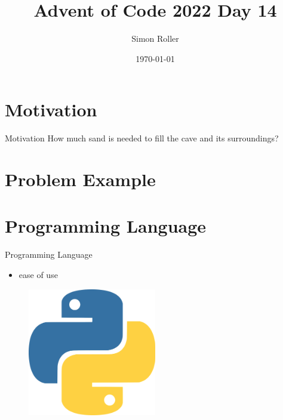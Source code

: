 \documentclass{beamer}
\title[Advent of Code 2022 Day 14]{Advent of Code 2022 Day 14}
\author{Simon Roller}
\institute{University of Tübingen}
\date{\today} %
\begin{document}
\begin{frame}
    \titlepage
\end{frame}

\section{Motivation}

\begin{frame}{Motivation}
How much sand is needed to fill the cave and its surroundings?
    \begin{figure}[H]
        \centering
        
    \end{figure}
\end{frame}

\section{Problem Example}



\section{Programming Language}

\begin{frame}{Programming Language}
    \begin{minipage}[c]{0.4\textwidth}
        \begin{itemize}
            \item ease of use
        \end{itemize}
    \end{minipage}%
    \begin{minipage}[c]{0.6\textwidth}
        \begin{figure}[H]
            \centering
            \includegraphics[width=0.5\textwidth]{Images/python_logo.png}
        \end{figure}
    \end{minipage}
\end{frame}
\end{document}
